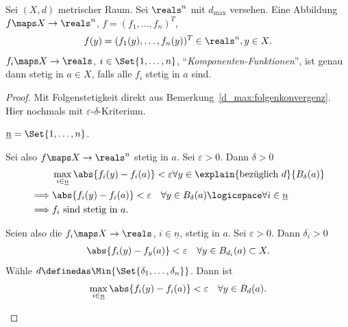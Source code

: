 \begin{lemma}\label{d_max:metrischer_raum_zu_r_stetigkeit:komponenten}
    Sei \( (X,d)\) metrischer Raum. Sei \( \reals^n\) mit \( d_{\max}\) versehen. Eine Abbildung \( f\maps X\to \reals ^n\), \( f=(f_1,\ldots, f_n)^T\), 
    \begin{align*}
        f(y)=(f_1(y),\ldots, f_n(y))^T\in \reals^n, y\in X.
    \end{align*}   
    \( f_i\maps X\to \reals \), \( i\in \Set{1,\ldots,n}\), \enquote{\emph{Komponenten-Funktionen}}, ist genau dann stetig in \( a\in X\), falls alle \( f_i\) stetig in \( a\) sind.
\end{lemma}
\begin{proof}
    Mit Folgenstetigkeit direkt aus Bemerkung~\ref{d_max:folgenkonvergenz}. Hier nochmals mit \( \varepsilon\)-\( \delta\)-Kriterium.
    \begin{notation*}
        \( \underline{n}=\Set{1,\ldots,n}\). 
    \end{notation*}
    \begin{proofdescription}
        \item[\hin] Sei also \( f\maps X\to \reals^n\) stetig in \( a\). Sei \( \varepsilon>0\). Dann \texists \( \delta>0\) \sd
        \begin{align*}
            &\max_{i\in \underline{n}}\abs{f_i(y)-f_i(a)}<\varepsilon\forall y\in \explain{\text{bezüglich }d}{B_\delta(a)}\\
            \implies &\abs{f_i(y)-f_i(a)}<\varepsilon\quad \forall y\in B_\delta(a)\logicspace \forall i\in \underline{n}\\
            \implies &f_i\text{ sind stetig in }a.
        \end{align*}  
        \item[\rueck] Seien also die \( f_i\maps X\to \reals \), \( i\in \underline{n}\), stetig in \( a\). Sei \( \varepsilon>0\). Dann \texists \( \delta_i>0\) \sd 
        \begin{align*}
            \abs{f_i(y)-f_y(a)}<\varepsilon\quad \forall y\in B_{d_i}(a)\subset X. 
        \end{align*}   
        Wähle \( d\definedas \Min{\Set{\delta_1,\ldots,\delta_n}}\). Dann ist
        \begin{align*}
            \max_{i\in \underline{n}}\abs{f_i(y)-f_i(a)}<\varepsilon\quad \forall y\in B_d(a). 
        \end{align*} 
    \end{proofdescription}
\end{proof}
